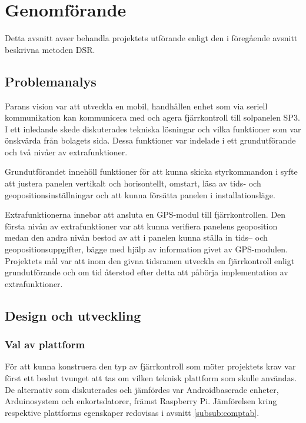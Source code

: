 \documentclass{article}
\begin{document}
    \newpage

    \section{Genomförande} %
    \label{sec:genomforande}
        Detta avsnitt avser behandla projektets utförande enligt den i föregående avsnitt be\-skrivna metoden DSR.
        
        \subsection{Problemanalys} %
        \label{sub:problemanalys}
            Parans vision var att utveckla en mobil, handhållen enhet som via seriell kommunikation kan kommunicera med och agera fjärrkontroll till solpanelen SP3.  I ett inledande \hbox{skede} diskuterades tekniska lösningar och vilka funktioner som var önskvärda från bolagets sida. Dessa funktioner var indelade i ett grundutförande och två nivåer av extrafunktioner. \bigskip
            
            \noindent Grundutförandet innehöll funktioner för att kunna skicka styrkommandon i syfte att justera panelen vertikalt och horisontellt, omstart, läsa av tids- och geopositionsinställningar och att kunna försätta panelen i installationsläge. \bigskip
            
            \noindent Extrafunktionerna innebar att ansluta en GPS-modul till fjärrkontrollen. Den första nivån av extrafunktioner var att kunna verifiera panelens geoposition medan den andra nivån bestod av att i panelen kunna ställa in tids-- och geopositionsuppgifter, bägge med hjälp av information givet av GPS-modulen. Projektets mål var att inom den givna tidsramen utveckla en fjärrkontroll enligt grundutförande och om tid återstod efter detta att påbörja implementation av extrafunktioner.

        \subsection{Design och utveckling} %
        \label{sub:design_och_utveckling}
        
            \subsubsection{Val av plattform} %
            \label{subsub:val_av_plattform}
            För att kunna konstruera den typ av fjärrkontroll som möter projektets krav var först ett beslut tvunget att tas om vilken teknisk plattform som skulle användas. De alternativ som diskuterades och jämfördes var Androidbaserade enheter, Arduinosystem och enkortsdatorer, främst Raspberry Pi. Jämförelsen kring respektive plattforms egenskaper redovisas i avsnitt \ref{subsub:comptab}.\bigskip
\end{document}
